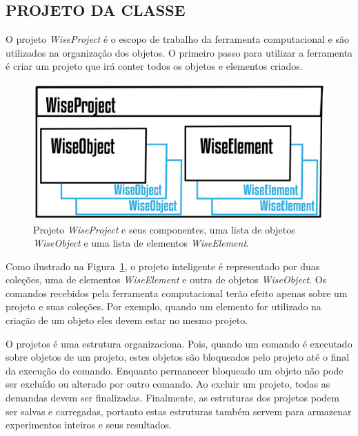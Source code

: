 \subsection{PROJETO DA CLASSE}\label{sec:projeto}

O projeto \textit{WiseProject} é o escopo de trabalho da ferramenta computacional e são utilizados na organização dos objetos. O primeiro passo para utilizar a ferramenta é criar um projeto que irá conter todos os objetos e elementos criados.


\begin{figure}[!htbp]
	\centering
	\includegraphics[scale=2]{Figures/WiseProject@16x.png}
	\caption{Projeto \textit{WiseProject} e seus componentes, uma lista de objetos \textit{WiseObject} e uma lista de elementos \textit{WiseElement}.}
	\label{fig7:project}
\end{figure}

Como ilustrado na Figura~\ref{fig7:project}, o projeto inteligente é representado por duas coleções, uma de elementos \textit{WiseElement} e outra de objetos \textit{WiseObject}. Os comandos recebidos pela ferramenta computacional terão efeito apenas sobre um projeto e suas coleções. Por exemplo, quando um elemento for utilizado na criação de um objeto eles devem estar no mesmo projeto.

O projetos é uma estrutura organizaciona. Pois, quando um comando é executado sobre objetos de um projeto, estes objetos são bloqueados pelo projeto até o final da execução do comando. Enquanto permanecer bloqueado um objeto não pode ser excluído ou alterado por outro comando. Ao excluir um projeto, todas as demandas devem ser finalizadas. Finalmente, as estruturas dos projetos podem ser salvas e carregadas, portanto estas estruturas também servem para armazenar experimentos inteiros e seus resultados.

